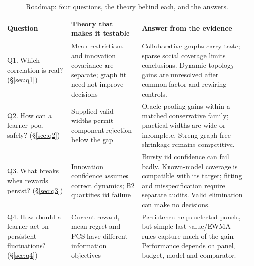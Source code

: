 \documentclass[11pt]{article}
\theoremstyle{definition}
\theoremstyle{remark}
\begin{document}
\begin{table}[t]\centering\small
\begin{tabularx}{\linewidth}{p{2.7cm}p{4.2cm}X}
\toprule
Question & Theory that makes it testable & Answer from the evidence \\
\midrule
Q1. Which correlation is real? (\S\ref{sec:q1}) & Mean restrictions and innovation covariance are separate; graph fit need not improve decisions & Collaborative graphs carry taste; sparse social coverage limits conclusions. Dynamic topology gains are unresolved after common-factor and rewiring controls. \\
Q2. How can a learner pool safely? (\S\ref{sec:q2}) & Supplied valid widths permit component rejection below the gap & Oracle pooling gains within a matched conservative family; practical widths are wide or incomplete. Strong graph-free shrinkage remains competitive. \\
Q3. What breaks when rewards persist? (\S\ref{sec:q3}) & Innovation confidence assumes correct dynamics; B2 quantifies iid failure & Bursty iid confidence can fail badly. Known-model coverage is compatible with its target; fitting and misspecification require separate audits. Valid elimination can make no decisions. \\
Q4. How should a learner act on persistent fluctuations? (\S\ref{sec:q4}) & Current reward, mean regret and PCS have different information objectives & Persistence helps selected panels, but simple last-value/EWMA rules capture much of the gain. Performance depends on panel, budget, model and comparator. \\
\bottomrule
\end{tabularx}
\caption{Roadmap: four questions, the theory behind each, and the answers.}\label{tab:roadmap}
\end{table}
\end{document}
